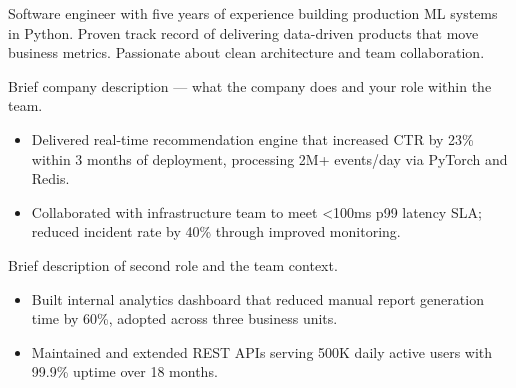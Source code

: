 \documentclass[10pt, a4paper]{cfcv}
\begin{document}
\makecvheader

Software engineer with five years of experience building production ML systems
in Python. Proven track record of delivering data-driven products that move
business metrics. Passionate about clean architecture and team collaboration.


Brief company description — what the company does and your role within the team.
\begin{itemize}
  \item Delivered real-time recommendation engine that increased CTR by 23\% within 3 months of deployment, processing 2M+ events/day via PyTorch and Redis.  %
  \item Collaborated with infrastructure team to meet <100ms p99 latency SLA; reduced incident rate by 40\% through improved monitoring.                         %
\end{itemize}

\divider

Brief description of second role and the team context.
\begin{itemize}
  \item Built internal analytics dashboard that reduced manual report generation time by 60\%, adopted across three business units.                                %
  \item Maintained and extended REST APIs serving 500K daily active users with 99.9\% uptime over 18 months.                                                     %
\end{itemize}
\end{document}

